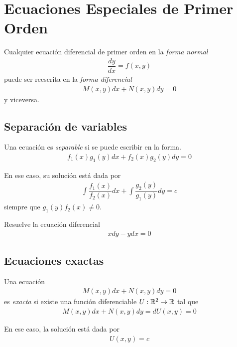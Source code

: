 \section{Ecuaciones Especiales de Primer Orden}


  Cualquier ecuación diferencial de primer orden en la \emph{forma normal}
     \begin{align*}
   \dfrac{dy}{dx} = f(x,y)
   \end{align*}
   puede ser reescrita en la \emph{forma diferencial}
       \begin{align*}
    M(x,y)dx+N(x,y)dy =0
    \end{align*}
    y  viceversa.


\subsection{Separación de variables}

Una ecuación es \emph{separable} si se puede escribir en la forma.
 \begin{align*}
 f_{1}(x)g_{1}(y)dx+f_{2}(x)g_{2}(y)dy = 0
 \end{align*}


{}
En ese caso, su solución  está dada por
   \begin{align*}
       \displaystyle \int \dfrac{f_{1}(x)}{f_{2}(x)}dx
       + \int \dfrac{g_{2}(y)}{g_{1}(y)}dy = c
  \end{align*}
  siempre que $g_{1}(y)f_{2}(x)\neq 0$.



	\begin{resuelto}
		Resuelve la ecuación diferencial
		\begin{align*}
		xdy-ydx=0
		\end{align*}
	\end{resuelto}

\subsection{Ecuaciones exactas}

  Una ecuación
     \begin{align*}
   M(x,y)dx + N(x,y)dy = 0
   \end{align*}
   es \emph{exacta} si
   existe una función diferenciable $U:\mathbb{R}^{2}\to \mathbb{R}$ tal que
       \begin{align*}
       M(x,y)dx + N(x,y)dy = dU(x,y) = 0
    \end{align*}


En ese caso, la solución está dada por
\begin{align*}
U(x,y) = c
\end{align*}


